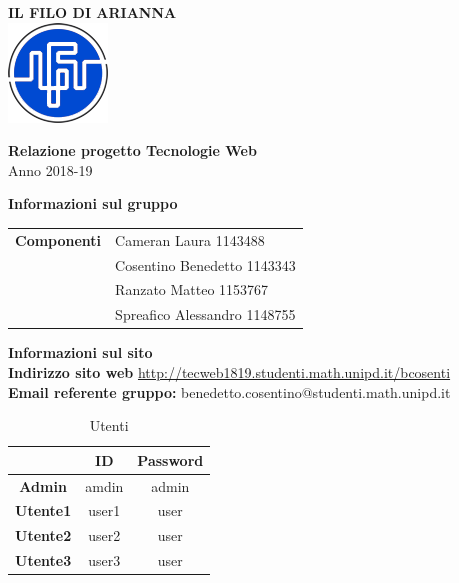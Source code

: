 \begin{center}
	\textbf{\Huge{IL FILO DI ARIANNA}}\\
	\vspace{15pt}
	\includegraphics{../img/logo.png}
\end{center}

\vspace{1.5cm}

\begin{center}
	\textbf{\huge{Relazione progetto Tecnologie Web}}\\[0.2cm]
	\Large{Anno 2018-19}
\end{center}

\vspace{5pt}

\begin{center}
	\textbf{\Large{Informazioni sul gruppo}}
\begin{table}[H]
	\hspace{3.5cm}
	\renewcommand{\arraystretch}{1.4}
	\begin{tabular}{l | l}
		\textbf{Componenti} & Cameran Laura 1143488\\
		& Cosentino Benedetto 1143343\\
		& Ranzato Matteo 1153767\\
		& Spreafico Alessandro 1148755\\
	\end{tabular}
\end{table}
\end{center}

\hspace{5pt}

\begin{center}
	\textbf{\Large{Informazioni sul sito}}\\
	\textbf{Indirizzo sito web} \url{http://tecweb1819.studenti.math.unipd.it/bcosenti}\\
	\textbf{Email referente gruppo:} benedetto.cosentino@studenti.math.unipd.it
	\renewcommand{\arraystretch}{1.8}
	\begin{longtable}[H]{c c c}
		\caption{Utenti}\\
		\rowcolor[HTML]{009ABB}
		\multicolumn{1}{c}{\color[HTML]{FFFFFF} \textbf{Utente}} &
		\multicolumn{1}{c}{\color[HTML]{FFFFFF} \textbf{ID}} &
		\multicolumn{1}{c}{\color[HTML]{FFFFFF} \textbf{Password}} \\
		\endhead
		\textbf{Admin} & amdin & admin\\
		\textbf{Utente1} & user1 & user\\
		\textbf{Utente2} & user2 & user\\
		\textbf{Utente3} & user3 & user\\
	\end{longtable}
\end{center}